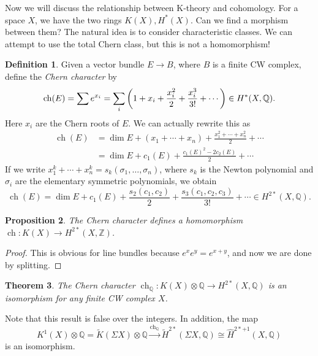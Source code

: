 \documentclass[leqno, openany]{memoir}
\newtheorem{thm}{Theorem}[section]
\newtheorem{prop}[thm]{Proposition}
\theoremstyle{definition}
\newtheorem{defn}[thm]{Definition}
\theoremstyle{remark}
\theoremstyle{plain}
\theoremstyle{definition}
\theoremstyle{remark}
\newcommand{\Z}{\mathbb{Z}}
\newcommand{\Q}{\mathbb{Q}}
\newcommand{\wt}[1]{\widetilde{#1}}
\newcommand{\wh}[1]{\widehat{#1}}
\DeclareMathOperator{\ch}{ch}
\begin{document}
Now we will discuss the relationship between K-theory and cohomology. For a space $X$, we have the two rings $K(X), H^*(X)$. Can we find a morphism between them? The natural idea is to consider characteristic classes. We can attempt to use the total Chern class, but this is not a homomorphism!

\begin{defn}
    Given a vector bundle $E \to B$, where $B$ is a finite CW complex, define the \textit{Chern character} by
    \[ \ch(E) = \sum e^{x_i} = \sum_i \qty(1 + x_i + \frac{x_i^2}{2} + \frac{x_i^3}{3!} + \cdots) \in H^*(X, \Q). \]
    Here $x_i$ are the Chern roots of $E$. We can actually rewrite this as
    \begin{align*}
        \ch(E) &= \dim E + (x_1 + \cdots + x_n) + \frac{x_1^2 + \cdots + x_n^2}{2} + \cdots \\
               &= \dim E + c_1(E) + \frac{{c_1(E)}^2 - 2 c_2(E)}{2} + \cdots
    \end{align*}
    If we write $x_1^k + \cdots + x_n^k = s_k(\sigma_1, \ldots, \sigma_n)$, where $s_k$ is the Newton polynomial and $\sigma_i$ are the elementary symmetric polynomials, we obtain
    \[ \ch(E) = \dim E + c_1(E) + \frac{s_2(c_1, c_2)}{2} + \frac{s_3(c_1, c_2, c_3)}{3!} + \cdots \in H^{2*}(X, \Q). \]
\end{defn}

\begin{prop}
    The Chern character defines a homomorphism $\ch \colon K(X) \to H^{2*}(X, \Z)$.
\end{prop}

\begin{proof}
    This is obvious for line bundles because $e^x e^y = e^{x+y}$, and now we are done by splitting.
\end{proof}

\begin{thm}
    The Chern character $\ch_{\Q} \colon K(X) \otimes \Q \to H^{2*}(X, \Q)$ is an isomorphism for any finite CW complex $X$.
\end{thm}

Note that this result is false over the integers. In addition, the map
\[ K^1(X) \otimes \Q = \wt{K}(\Sigma X) \otimes \Q \xrightarrow{\ch_{\Q}} \wt{H}^{2*}(\Sigma X, \Q) \cong \wh{H}^{2*+1}(X, \Q) \]
is an isomorphism.
\end{document}
